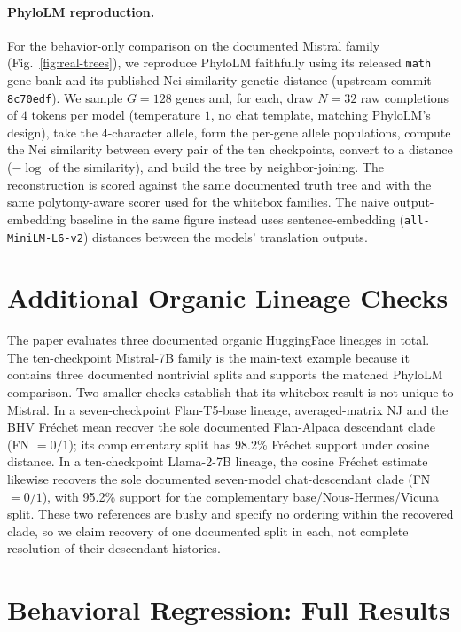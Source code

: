 \documentclass{article}
\theoremstyle{definition}
\theoremstyle{plain}
\begin{document}
\paragraph{PhyloLM reproduction.} For the behavior-only comparison on the documented Mistral family
(Fig.~\ref{fig:real-trees}), we reproduce PhyloLM \citep{yax2025phylolm} faithfully using its released
\texttt{math} gene bank and its published Nei-similarity genetic distance (upstream commit
\texttt{8c70edf}). We sample $G=128$ genes and, for each, draw $N=32$ raw completions of $4$ tokens per
model (temperature $1$, no chat template, matching PhyloLM's design), take the $4$-character allele,
form the per-gene allele populations, compute the Nei similarity between every pair of the ten
checkpoints, convert to a distance ($-\log$ of the similarity), and build the tree by neighbor-joining.
The reconstruction is scored against the same documented truth tree and with the same polytomy-aware
scorer used for the whitebox families. The naive output-embedding baseline in the same figure instead
uses sentence-embedding (\texttt{all-MiniLM-L6-v2}) distances between the models' translation outputs.

\section{Additional Organic Lineage Checks}
\label{app:organic-additional}

The paper evaluates three documented organic HuggingFace lineages in total. The ten-checkpoint
Mistral-7B family is the main-text example because it contains three documented nontrivial splits and
supports the matched PhyloLM comparison. Two smaller checks establish that its whitebox result is not
unique to Mistral. In a seven-checkpoint Flan-T5-base lineage, averaged-matrix NJ and the BHV Fr\'echet
mean recover the sole documented Flan-Alpaca descendant clade (FN $=0/1$); its complementary split has
98.2\% Fr\'echet support under cosine distance. In a ten-checkpoint Llama-2-7B lineage, the cosine
Fr\'echet estimate likewise recovers the sole documented seven-model chat-descendant clade (FN
$=0/1$), with 95.2\% support for the complementary base/Nous-Hermes/Vicuna split. These two references
are bushy and specify no ordering within the recovered clade, so we claim recovery of one documented
split in each, not complete resolution of their descendant histories.


\section{Behavioral Regression: Full Results}
\label{app:regression}
\end{document}

